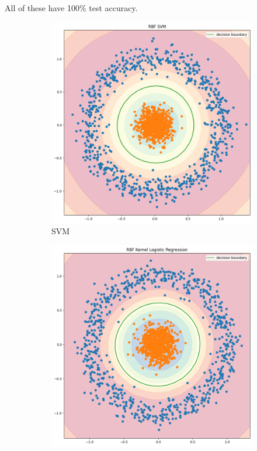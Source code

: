 \documentclass[a4paper]{article}
\theoremstyle{definition}
\newenvironment{soln}{
    \leavevmode\color{blue}\ignorespaces
}{}
\begin{document}
\begin{itemize}
     \begin{soln}
        All of these have 100\% test accuracy.
         \begin{figure}[H]
            \centering
            \begin{subfigure}[b]{0.5\textwidth}
                \centering
                \includegraphics[scale=0.2]{Images/q2_2_2/SVM_RBF.png}
                \caption{SVM}
            \end{subfigure}%
            \begin{subfigure}[b]{0.5\textwidth}
                \centering
                \includegraphics[scale=0.2]{Images/q2_2_2/Log_RBF.png}

\end{subfigure}
\end{figure}
\end{soln}
\end{itemize}
\end{document}
